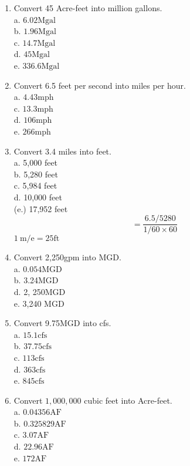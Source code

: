 \begin{enumerate}
\item Convert 45 Acre-feet into million gallons.\\
a. $6.02 \mathrm{Mgal}$\\
b. $1.96 \mathrm{Mgal}$\\
c. $14.7 \mathrm{Mgal}$\\
d. $45 \mathrm{Mgal}$\\
e. $336.6 \mathrm{Mgal}$\\
\item Convert 6.5 feet per second into miles per hour.\\
a. $4.43 \mathrm{mph}$\\
c. $13.3 \mathrm{mph}$\\
d. $106 \mathrm{mph}$\\
e. $266 \mathrm{mph}$\\
\item Convert 3.4 miles into feet.\\
a. 5,000 feet\\
b. 5,280 feet\\
c. 5,984 feet\\
d. 10,000 feet\\
(e.) 17,952 feet\\
$$
=\frac{6.5 / 5280}{1 / 60 \times 60}
$$
$1 \mathrm{~m} / \mathrm{e}=25 \mathrm{ft}$\\
\item Convert 2,250gpm into MGD.\\
a. $0.054 \mathrm{MGD}$\\
b. 3.24MGD\\
d. 2, 250MGD\\
e. 3,240 MGD\\
\item Convert 9.75MGD into cfs.\\
a. $15.1 \mathrm{cfs}$\\
b. $37.75 \mathrm{cfs}$\\
c. $113 \mathrm{cfs}$\\
d. $363 \mathrm{cfs}$\\
e. $845 \mathrm{cfs}$\\
\item Convert $1,000,000$ cubic feet into Acre-feet.\\
a. $0.04356 \mathrm{AF}$\\
b. $0.325829 \mathrm{AF}$\\
c. $3.07 \mathrm{AF}$\\
d. $22.96 \mathrm{AF}$\\
e. $172 \mathrm{AF}$\\

\end{enumerate}
